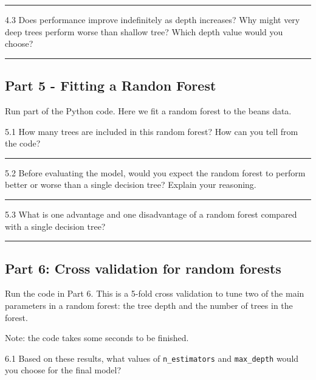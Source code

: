 \documentclass[
  a4paper,
  DIV=11,
  numbers=noendperiod]{scrartcl}
\begin{document}
\begin{center}\rule{0.5\linewidth}{0.5pt}\end{center}

4.3 Does performance improve indefinitely as depth increases? Why might
very deep trees perform worse than shallow tree? Which depth value would
you choose?

\begin{center}\rule{0.5\linewidth}{0.5pt}\end{center}

\subsection{Part 5 - Fitting a Randon
Forest}\label{part-5---fitting-a-randon-forest}

Run part of the Python code. Here we fit a random forest to the beans
data.

5.1 How many trees are included in this random forest? How can you tell
from the code?

\begin{center}\rule{0.5\linewidth}{0.5pt}\end{center}

5.2 Before evaluating the model, would you expect the random forest to
perform better or worse than a single decision tree? Explain your
reasoning.

\begin{center}\rule{0.5\linewidth}{0.5pt}\end{center}

5.3 What is one advantage and one disadvantage of a random forest
compared with a single decision tree?

\begin{center}\rule{0.5\linewidth}{0.5pt}\end{center}

\subsection{Part 6: Cross validation for random
forests}\label{part-6-cross-validation-for-random-forests}

Run the code in Part 6. This is a 5-fold cross validation to tune two of
the main parameters in a random forest: the tree depth and the number of
trees in the forest.

Note: the code takes some seconds to be finished.

6.1 Based on these results, what values of \texttt{n\_estimators} and
\texttt{max\_depth} would you choose for the final model?
\end{document}
